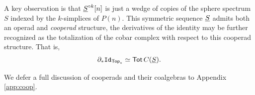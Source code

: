 \begin{remark}A key observation is that $\underline{S}^{\circ k}[n]$ is just a wedge of copies of the sphere spectrum $S$ indexed by the $k$-simplices of $P(n)$. This symmetric sequence $\underline{S}$ admits both an operad and \textit{cooperad} structure, the derivatives of the identity may be further recognized as the totalization of the cobar complex with respect to this cooperad structure. That is, \[ \partial_* \mathtt{Id}_{\mathsf{Top}_*}\simeq \operatorname{\mathsf{Tot}} C(\underline{S}).\]

We defer a full discussion of cooperads and their coalgebras to Appendix \ref{app:coop}. 
\end{remark}



